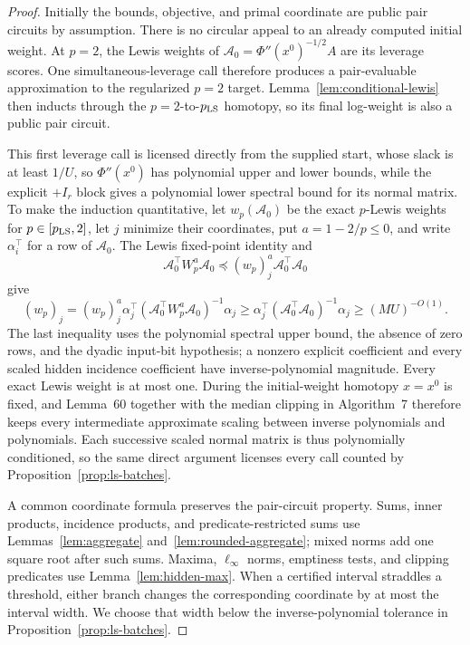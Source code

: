 \documentclass[11pt]{article}
\theoremstyle{definition}
\begin{document}
\begin{proof}
Initially the bounds, objective, and primal coordinate are public pair
circuits by assumption.  There is no circular appeal to an already computed
initial weight.  At $p=2$, the Lewis weights of
$\mathcal A_0=\Phi''(x^0)^{-1/2}A$ are its leverage scores.  One simultaneous-leverage
call therefore produces a pair-evaluable approximation to the
regularized $p=2$ target.  Lemma~\ref{lem:conditional-lewis} then inducts
through the $p=2$-to-$p_{\rm LS}$ homotopy, so its final log-weight is also a
public pair circuit.

This first leverage call is licensed directly from the supplied start, whose
slack is at least $1/U$, so
$\Phi''(x^0)$ has polynomial upper and lower bounds, while the explicit
$+I_r$ block gives a polynomial lower spectral bound for its normal matrix.
To make the induction quantitative, let $w_p(\mathcal A_0)$ be the exact
$p$-Lewis
weights for $p\in[p_{\rm LS},2]$, let $j$ minimize their coordinates, put
$a=1-2/p\le0$, and write $\alpha_i^\top$ for a row of $\mathcal A_0$.  The Lewis fixed-point
identity and
\[
 \mathcal A_0^\top W_p^a\mathcal A_0\preceq
 (w_p)_j^a \mathcal A_0^\top\mathcal A_0
\]
give
\[
 (w_p)_j=(w_p)_j^a \alpha_j^\top
 (\mathcal A_0^\top W_p^a\mathcal A_0)^{-1}\alpha_j
 \ge \alpha_j^\top
       (\mathcal A_0^\top\mathcal A_0)^{-1}\alpha_j
 \ge(MU)^{-O(1)}.
\]
The last inequality uses the polynomial spectral upper bound, the absence of
zero rows, and the dyadic input-bit hypothesis; a nonzero explicit
coefficient and every scaled hidden incidence coefficient have
inverse-polynomial magnitude.
Every exact Lewis weight is at most one.  During the initial-weight homotopy
$x=x^0$ is fixed, and Lemma~60 together with the median clipping in
Algorithm~7 therefore keeps every intermediate approximate scaling between
inverse polynomials and polynomials.  Each successive scaled normal matrix is
thus polynomially conditioned, so the same direct argument licenses every
call counted by Proposition~\ref{prop:ls-batches}.

A common coordinate formula preserves the pair-circuit property.  Sums,
inner products, incidence products, and predicate-restricted sums use
Lemmas~\ref{lem:aggregate} and~\ref{lem:rounded-aggregate}; mixed norms add
one square root after such sums.  Maxima, $\ell_\infty$ norms, emptiness
tests, and clipping predicates use Lemma~\ref{lem:hidden-max}.  When a
certified interval straddles a threshold, either branch changes the
corresponding coordinate by at most the interval width.  We choose that width
below the inverse-polynomial tolerance in
Proposition~\ref{prop:ls-batches}.


\end{proof}
\end{document}
